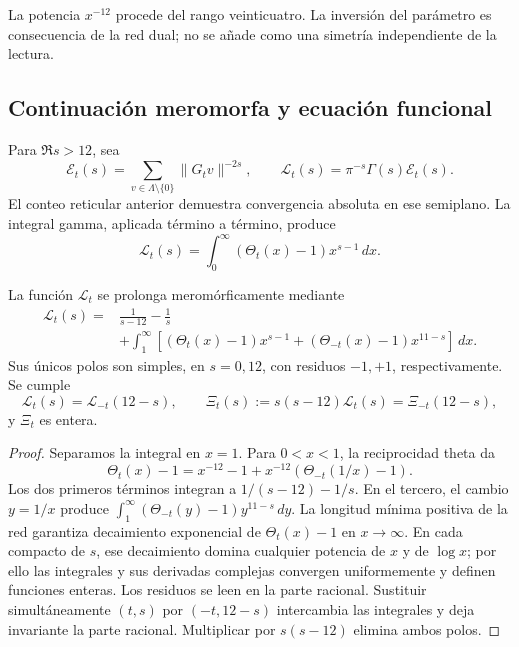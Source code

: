 La potencia \(x^{-12}\) procede del rango veinticuatro. La inversión del parámetro es consecuencia de la red dual; no se añade como una simetría independiente de la lectura.

\subsection{Continuación meromorfa y ecuación funcional}

Para \(\Re s>12\), sea
\begin{equation}
 \mathcal E_t(s)=\sum_{v\in\Lambda\setminus\{0\}}\|G_tv\|^{-2s},
 \qquad \mathcal L_t(s)=\pi^{-s}\Gamma(s)\mathcal E_t(s).
 \label{rec:eq:epstein}
\end{equation}
El conteo reticular anterior demuestra convergencia absoluta en ese semiplano. La integral gamma, aplicada término a término, produce
\[
 \mathcal L_t(s)=\int_0^\infty(\Theta_t(x)-1)x^{s-1}\,dx.
\]

\begin{theorem}
\label{rec:thm:mellin}
La función \(\mathcal L_t\) se prolonga meromórficamente mediante
\begin{align}
 \mathcal L_t(s)={}&\frac1{s-12}-\frac1s\nonumber\\
 &+\int_1^\infty\left[(\Theta_t(x)-1)x^{s-1}
                 +(\Theta_{-t}(x)-1)x^{11-s}\right]\,dx.
 \label{rec:eq:mellin-partida}
\end{align}
Sus únicos polos son simples, en \(s=0,12\), con residuos \(-1,+1\), respectivamente. Se cumple
\begin{equation}
 \mathcal L_t(s)=\mathcal L_{-t}(12-s),\qquad
 \Xi_t(s):=s(s-12)\mathcal L_t(s)=\Xi_{-t}(12-s),
 \label{rec:eq:funcional}
\end{equation}
y \(\Xi_t\) es entera.
\end{theorem}
\begin{proof}
Separamos la integral en \(x=1\). Para \(0<x<1\), la reciprocidad theta da
\[
 \Theta_t(x)-1=x^{-12}-1+x^{-12}(\Theta_{-t}(1/x)-1).
\]
Los dos primeros términos integran a \(1/(s-12)-1/s\). En el tercero, el cambio \(y=1/x\) produce
\(\int_1^\infty(\Theta_{-t}(y)-1)y^{11-s}\,dy\).
La longitud mínima positiva de la red garantiza decaimiento exponencial de \(\Theta_t(x)-1\) en \(x\to\infty\). En cada compacto de \(s\), ese decaimiento domina cualquier potencia de \(x\) y de \(\log x\); por ello las integrales y sus derivadas complejas convergen uniformemente y definen funciones enteras. Los residuos se leen en la parte racional. Sustituir simultáneamente \((t,s)\) por \((-t,12-s)\) intercambia las integrales y deja invariante la parte racional. Multiplicar por \(s(s-12)\) elimina ambos polos.
\end{proof}

